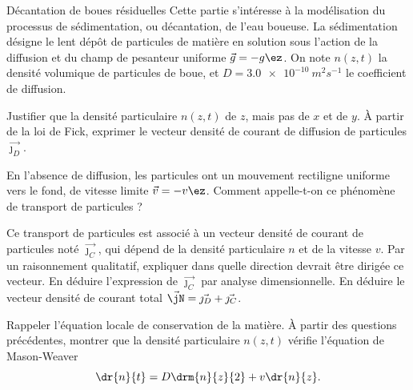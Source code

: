\begin{exo}[PC][2][TD]{Décantation de boues résiduelles}
Cette partie s'intéresse à la modélisation du processus de sédimentation, ou décantation, de l'eau boueuse. La sédimentation désigne le lent dépôt de particules de matière en solution sous l'action de la diffusion et du champ de pesanteur uniforme $\Vec{g} = -g \ez$. 
On note $n(z,t)$ la densité volumique de
particules de boue, et $D = \SI{3.0e-10}{m^2s^{-1}}$ le coefficient de diffusion.
\begin{quest}
\item Justifier que la densité particulaire $n(z,t)$ de $z$, mais pas de $x$ et de $y$. À partir de la loi de Fick, exprimer le vecteur densité de courant de diffusion de particules $\Vec{\jmath_D}$.


\item En l'absence de diffusion, les particules ont un mouvement rectiligne uniforme vers le fond, de vitesse limite $\Vec{v} = - v \ez$.
 Comment appelle-t-on ce phénomène de transport de particules ?
\item Ce transport de particules est associé à un vecteur densité de courant de particules noté $\Vec{\jmath_C}$, qui dépend de la densité particulaire $n$ et de la vitesse $v$.
Par un raisonnement qualitatif, expliquer dans quelle direction devrait être dirigée ce vecteur. En déduire l'expression de $\Vec{\jmath_C}$ par analyse dimensionnelle.
En déduire le vecteur densité de courant total $\Vec{\jN} = \Vec{\jmath_D} + \Vec{\jmath_C}$.
\item Rappeler l'équation locale de conservation de la matière. %
À partir des questions précédentes, montrer que la densité particulaire $n(z,t)$ vérifie l'équation de Mason-Weaver
\begin{equation}\label{eq:MW}
\dr{n}{t} = D \drm{n}{z}{2} + v \dr{n}{z}.
\end{equation}
\end{quest}


\end{exo}
